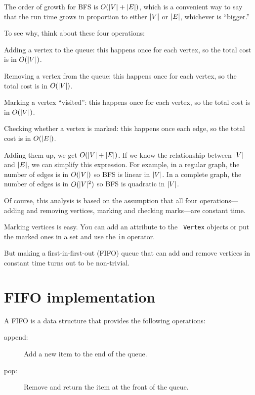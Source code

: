 \documentclass[10pt]{book}
\begin{document}
The order of growth for BFS is $O(|V| + |E|)$, which is a convenient
way to say that the run time grows in proportion to either $|V|$ or
$|E|$, whichever is ``bigger.''

To see why, think about these four operations: 

\begin{description}

\item Adding a vertex to the queue: this happens once for each
vertex, so the total cost is in $O(|V|)$.

\item Removing a vertex from the queue: this happens once for each
vertex, so the total cost is in $O(|V|)$.

\item Marking a vertex ``visited'': this happens once for each
vertex, so the total cost is in $O(|V|)$.

\item Checking whether a vertex is marked: this happens once each
edge, so the total cost is in $O(|E|)$.

\end{description}

Adding them up, we get $O(|V| + |E|)$.  If we know the relationship
between $|V|$ and $|E|$, we can simplify this expression.  For
example, in a regular graph, the number of edges is in $O(|V|)$ so BFS
is linear in $|V|$.  In a complete graph, the number of edges is in
$O(|V|^2)$ so BFS is quadratic in $|V|$.

Of course, this analysis is based on the assumption that all four
operations---adding and removing vertices, marking and checking
marks---are constant time.

Marking vertices is easy.  You can add an attribute to the {\tt
  Vertex} objects or put the marked ones in a set and use
the {\tt in} operator.

But making a first-in-first-out (FIFO) queue that can add and remove
vertices in constant time turns out to be non-trivial.


\section{FIFO implementation}

A FIFO is a data structure that provides the following operations:

\begin{description}

\item[append:] Add a new item to the end of the queue.

\item[pop:] Remove and return the item at the front of the queue.

\end{description}
\end{document}
